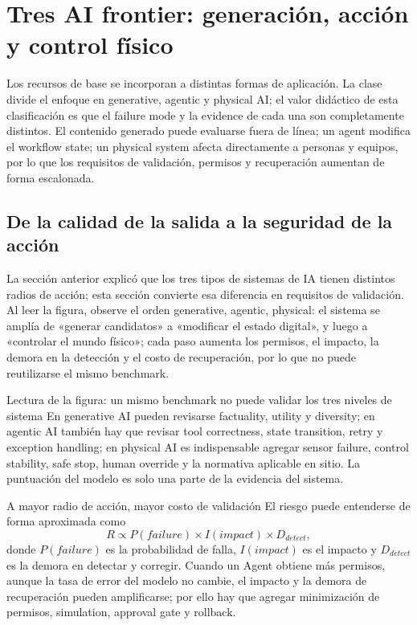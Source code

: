 \section{Tres AI frontier: generación, acción y control físico}

Los recursos de base se incorporan a distintas formas de aplicación. La clase divide el enfoque en generative, agentic y physical AI; el valor didáctico de esta clasificación es que el failure mode y la evidence de cada una son completamente distintos. El contenido generado puede evaluarse fuera de línea; un agent modifica el workflow state; un physical system afecta directamente a personas y equipos, por lo que los requisitos de validación, permisos y recuperación aumentan de forma escalonada.

\subsection{De la calidad de la salida a la seguridad de la acción}

La sección anterior explicó que los tres tipos de sistemas de IA tienen distintos radios de acción; esta sección convierte esa diferencia en requisitos de validación. Al leer la figura, observe el orden generative, agentic, physical: el sistema se amplía de «generar candidatos» a «modificar el estado digital», y luego a «controlar el mundo físico»; cada paso aumenta los permisos, el impacto, la demora en la detección y el costo de recuperación, por lo que no puede reutilizarse el mismo benchmark.


\begin{knowledgebox}{Lectura de la figura: un mismo benchmark no puede validar los tres niveles de sistema}
En generative AI pueden revisarse factuality, utility y diversity; en agentic AI también hay que revisar tool correctness, state transition, retry y exception handling; en physical AI es indispensable agregar sensor failure, control stability, safe stop, human override y la normativa aplicable en sitio. La puntuación del modelo es solo una parte de la evidencia del sistema.
\end{knowledgebox}

\begin{importantbox}{A mayor radio de acción, mayor costo de validación}
El riesgo puede entenderse de forma aproximada como
\[
R \propto P(failure)\times I(impact)\times D_{detect},
\]
donde $P(failure)$ es la probabilidad de falla, $I(impact)$ es el impacto y $D_{detect}$ es la demora en detectar y corregir. Cuando un Agent obtiene más permisos, aunque la tasa de error del modelo no cambie, el impacto y la demora de recuperación pueden amplificarse; por ello hay que agregar minimización de permisos, simulation, approval gate y rollback.
\end{importantbox}

